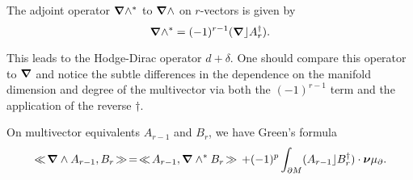 \begin{definition}
The adjoint operator $\boldsymbol{\nabla} \wedge^*$ to $\boldsymbol{\nabla} \wedge$ on $r$-vectors is given by
\begin{equation}
\boldsymbol{\nabla} \wedge^* = (-1)^{r-1} (\boldsymbol{\nabla} \rfloor A_r^\dagger).
\end{equation}
\end{definition}
This leads to the Hodge-Dirac operator $d+\delta$. One should compare this operator to $\boldsymbol{\nabla}$ and notice the subtle differences in the dependence on the manifold dimension and degree of the multivector via both the $(-1)^{r-1}$ term and the application of the reverse $\dagger$.

\begin{proposition}
On multivector equivalents $A_{r-1}$ and $B_r$, we have Green's formula
\begin{equation}
\hspace*{.5mm}\ll \hspace*{-.5mm} \boldsymbol{\nabla} \wedge A_{r-1}, B_r \hspace*{-.5mm}\gg \hspace*{.5mm} = \hspace*{.5mm}\ll \hspace*{-.5mm} A_{r-1}, \boldsymbol{\nabla} \wedge^* B_r \hspace*{-.5mm}\gg \hspace*{.5mm} + (-1)^{p} \int_{\partial M} (A_{r-1}\rfloor B_r^\dagger) \cdot \boldsymbol{\nu} \mu_\partial.
\end{equation}
\end{proposition}
